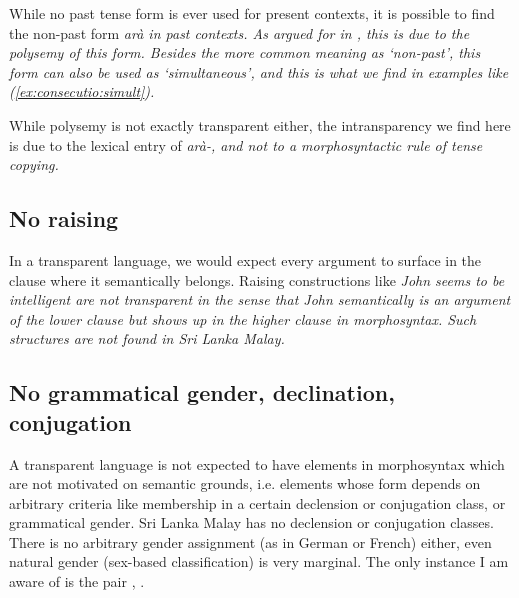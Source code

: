 \documentclass[a4paper]{article}
\begin{document}

While no past tense form is ever used for present contexts, it is possible to find the non-past form \em arà \em in past contexts. As argued for in \citet[289f]{Nordhoff2009phd}, this is due to the polysemy of this form. Besides the more common meaning as `non-past', this form can also be used as `simultaneous', and this is what we find in examples like (\ref{ex:consecutio:simult}).


While polysemy is not exactly transparent either, the intransparency we find here is due to the lexical entry of \em arà-\em, and not to a morphosyntactic rule of tense copying.

\subsection{No raising}
In a transparent language, we would expect every argument to surface in the clause where it semantically belongs. Raising constructions like \em John seems to be intelligent \em are not transparent in the  sense that \em John \em semantically is an argument of the lower clause but shows up in the higher clause in morphosyntax. Such structures are not found in Sri Lanka Malay.

\subsection{No grammatical gender, declination, conjugation}
A transparent language is not expected to have elements in morphosyntax which are not motivated on semantic grounds, i.e. elements whose form depends on arbitrary criteria like membership in a certain declension or conjugation class, or grammatical gender.
Sri Lanka Malay has no declension or conjugation classes. There is no arbitrary gender assignment (as in German or French) either, even natural gender (sex-based classification) is very marginal. The only instance I am aware of is the pair , .
\end{document}
